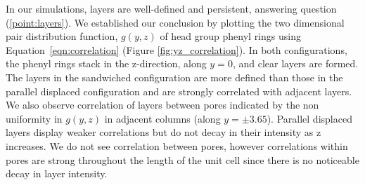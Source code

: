 \documentclass[journal=jpcbfk,manusciprt=article]{achemso}
\begin{document}
  In our simulations, layers are well-defined and persistent, answering question
  (\ref{point:layers}). We established our conclusion by plotting the two
  dimensional pair distribution function, $g(y,z)$ of head group phenyl rings
  using Equation~\ref{eqn:correlation} (Figure \ref{fig:yz_correlation}). In both
  configurations, the phenyl rings stack in the z-direction, along $y=0$, and
  clear layers are formed. The layers in the sandwiched configuration are more
  defined than those in the parallel displaced configuration and are strongly
  correlated with adjacent layers. We also observe correlation of layers between
  pores indicated by the non uniformity in $g(y,z)$ in adjacent columns (along $y
  = \pm 3.65$). Parallel displaced layers display weaker correlations but do not
  decay in their intensity as z increases. We do not see correlation between
  pores, however correlations within pores are strong throughout the length of
  the unit cell since there is no noticeable decay in layer intensity. 
\end{document}
